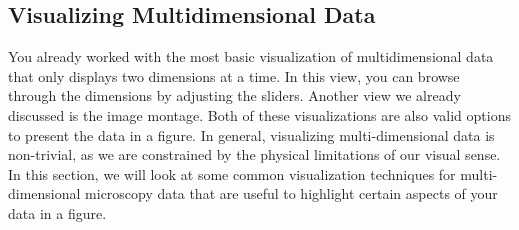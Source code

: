 \subsection{Visualizing Multidimensional Data}
You already worked with the most basic visualization of multidimensional data that only displays two dimensions at a time. In this view, you can browse through the dimensions by adjusting the sliders. Another view we already discussed is the image montage. Both of these visualizations are also valid options to present the data in a figure. In general, visualizing multi-dimensional data is non-trivial, as we are constrained by the physical limitations of our visual sense. In this section, we will look at some common visualization techniques for multi-dimensional microscopy data that are useful to highlight certain aspects of your data in a figure.

